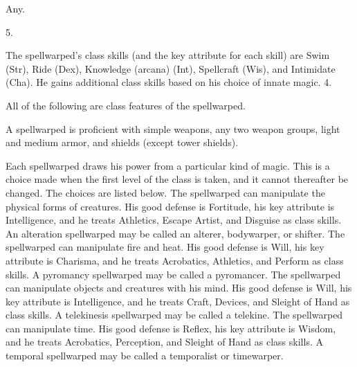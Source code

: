  Any.

 5.

The spellwarped's class skills (and the key attribute for each skill) are Swim (Str), Ride (Dex), Knowledge (arcana) (Int), Spellcraft (Wis), and Intimidate (Cha). He gains additional class skills based on his choice of innate magic.
 4.

All of the following are class features of the spellwarped.

A spellwarped is proficient with simple weapons, any two weapon groups, light and medium armor, and shields (except tower shields).

 Each spellwarped draws his power from a particular kind of magic. This is a choice made when the first level of the class is taken, and it cannot thereafter be changed. The choices are listed below.
 The spellwarped can manipulate the physical forms of creatures. His good defense is Fortitude, his key attribute is Intelligence, and he treats Athletics, Escape Artist, and Disguise as class skills. An alteration spellwarped may be called an alterer, bodywarper, or shifter.
 The spellwarped can manipulate fire and heat. His good defense is Will, his key attribute is Charisma, and he treats Acrobatics, Athletics, and Perform as class skills. A pyromancy spellwarped may be called a pyromancer.
 The spellwarped can manipulate objects and creatures with his mind. His good defense is Will, his key attribute is Intelligence, and he treats Craft, Devices, and Sleight of Hand as class skills. A telekinesis spellwarped may be called a telekine.
 The spellwarped can manipulate time. His good defense is Reflex, his key attribute is Wisdom, and he treats Acrobatics, Perception, and Sleight of Hand as class skills. A temporal spellwarped may be called a temporalist or timewarper.

